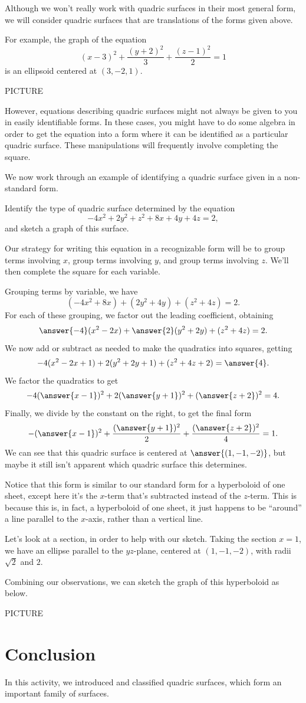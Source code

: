 \documentclass{ximera}
\begin{document}
Although we won't really work with quadric surfaces in their most general form, we will consider quadric surfaces that are translations of the forms given above.

For example, the graph of the equation
\[
(x-3)^2 + \frac{(y+2)^2}{3} + \frac{(z-1)^2}{2} = 1
\]
is an ellipsoid centered at $(3,-2,1)$.

PICTURE

However, equations describing quadric surfaces might not always be given to you in easily identifiable forms. In these cases, you might have to do some algebra in order to get the equation into a form where it can be identified as a particular quadric surface. These manipulations will frequently involve completing the square.

We now work through an example of identifying a quadric surface given in a non-standard form.

\begin{example}
Identify the type of quadric surface determined by the equation
\[
-4x^2 + 2y^2 + z^2 + 8x + 4y+4z = 2,
\]
and sketch a graph of this surface.

Our strategy for writing this equation in a recognizable form will be to group terms involving $x$, group terms involving $y$, and group terms involving $z$. We'll then complete the square for each variable.

Grouping terms by variable, we have
\[
(-4x^2+8x) + (2y^2 + 4y) + (z^2 + 4z) = 2.
\]
For each of these grouping, we factor out the leading coefficient, obtaining
\[
\answer{-4}(x^2-2x) + \answer{2}(y^2 + 2y) + (z^2 + 4z) = 2.
\]
We now add or subtract as needed to make the quadratics into squares, getting
\[
-4(x^2-2x + 1) + 2(y^2 + 2y + 1) + (z^2 + 4z + 2) = \answer{4}.
\]
We factor the quadratics to get
\[
-4(\answer{x-1})^2 + 2(\answer{y+1})^2 + (\answer{z+2})^2 = 4.
\]
Finally, we divide by the constant on the right, to get the final form
\[
-(\answer{x-1})^2 + \frac{(\answer{y+1})^2}{2} + \frac{(\answer{z+2})^2}{4} = 1.
\]
We can see that this quadric surface is centered at $\answer{(1,-1,-2)}$, but maybe it still isn't apparent which quadric surface this determines.

Notice that this form is similar to our standard form for a hyperboloid of one sheet, except here it's the $x$-term that's subtracted instead of the $z$-term. This is because this is, in fact, a hyperboloid of one sheet, it just happens to be ``around'' a line parallel to the $x$-axis, rather than a vertical line.

Let's look at a section, in order to help with our sketch. Taking the section $x = 1$, we have an ellipse parallel to the $yz$-plane, centered at $(1,-1,-2)$, with radii $\sqrt{2}$ and $2$.

Combining our observations, we can sketch the graph of this hyperboloid as below.

PICTURE
\end{example}

\section{Conclusion}

In this activity, we introduced and classified quadric surfaces, which form an important family of surfaces.
\end{document}

